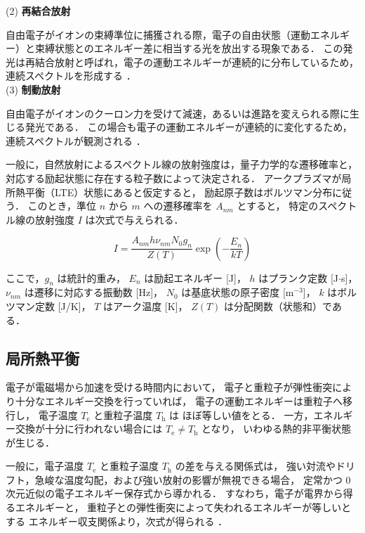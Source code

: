 \documentclass[dvipdfmx,report,uplatex]{jsbook}
\numberwithin{equation}{section}
\numberwithin{figure}{section}
\numberwithin{table}{section}
\begin{document}
(2) \textbf{再結合放射}  

自由電子がイオンの束縛準位に捕獲される際，電子の自由状態（運動エネルギー）と束縛状態とのエネルギー差に相当する光を放出する現象である．
この発光は再結合放射と呼ばれ，電子の運動エネルギーが連続的に分布しているため，連続スペクトルを形成する
\cite{YamamotoMurayama1995,KinoshitaOtaNagaiMinami2015}．\\

(3) \textbf{制動放射}  

自由電子がイオンのクーロン力を受けて減速，あるいは進路を変えられる際に生じる発光である．
この場合も電子の運動エネルギーが連続的に変化するため，連続スペクトルが観測される
\cite{YamamotoMurayama1995,KinoshitaOtaNagaiMinami2015}．

一般に，自然放射によるスペクトル線の放射強度は，量子力学的な遷移確率と，
対応する励起状態に存在する粒子数によって決定される．
アークプラズマが局所熱平衡（LTE）状態にあると仮定すると，
励起原子数はボルツマン分布に従う．
このとき，準位 $n$ から $m$ への遷移確率を $A_{nm}$ とすると，
特定のスペクトル線の放射強度 $I$ は次式で与えられる．

\begin{equation}
I = \frac{A_{nm} h \nu_{nm} N_0 g_n}{Z(T)}
\exp \left( -\frac{E_n}{kT} \right)
\label{eq:line_intensity}
\end{equation}

ここで，$g_n$ は統計的重み，
$E_n$ は励起エネルギー [J]，
$h$ はプランク定数 [J$\cdot$s]，
$\nu_{nm}$ は遷移に対応する振動数 [Hz]，
$N_0$ は基底状態の原子密度 [m$^{-3}$]，
$k$ はボルツマン定数 [J/K]，
$T$ はアーク温度 [K]，
$Z(T)$ は分配関数（状態和）である．



\subsection{局所熱平衡}
電子が電磁場から加速を受ける時間内において，
電子と重粒子が弾性衝突により十分なエネルギー交換を行っていれば，
電子の運動エネルギーは重粒子へ移行し，
電子温度 $T_{\mathrm{e}}$ と重粒子温度 $T_{\mathrm{h}}$ は
ほぼ等しい値をとる．
一方，エネルギー交換が十分に行われない場合には
$T_{\mathrm{e}} \neq T_{\mathrm{h}}$ となり，
いわゆる熱的非平衡状態が生じる．

一般に，電子温度 $T_{\mathrm{e}}$ と重粒子温度 $T_{\mathrm{h}}$ の差を与える関係式は，
強い対流やドリフト，急峻な温度勾配，および強い放射の影響が無視できる場合，
定常かつ 0 次元近似の電子エネルギー保存式から導かれる．
すなわち，電子が電界から得るエネルギーと，
重粒子との弾性衝突によって失われるエネルギーが等しいとする
エネルギー収支関係より，次式が得られる
\cite{田中康規2006熱プラズマにおける非平衡性}．
\end{document}
